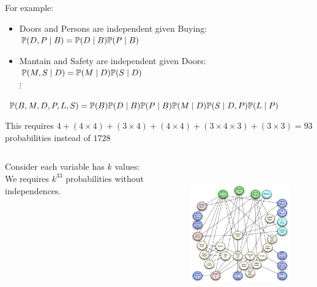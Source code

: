 \begin{frame}[fragile]
	For example:
	\begin{figure}
		\centering
		
	\end{figure}
	\begin{block}{}
		\begin{itemize}
			\item \alert{Doors} and \alert{Persons} are independent given \alert{Buying}: $\P( D , P \mid B ) = \P( D \mid B ) \P( P \mid B )$
			\item \alert{Mantain} and \alert{Safety} are independent given \alert{Doors}: $\P( M , S \mid D ) = \P( M \mid D ) \P( S \mid D )$
			\\$\vdots$
		\end{itemize}
	\end{block}
\end{frame}

\begin{frame}[fragile]
	\begin{figure}
		\centering
		
	\end{figure}
	\begin{block}{}
		$\P( B , M , D , P , L , S ) = \P( B ) \P( D \mid B ) \P( P \mid B ) \P( M \mid D ) \P( S \mid D , P ) \P( L \mid P )$
	\end{block}
	This requires $4 + (4 \times 4) + (3 \times 4) + (4 \times 4) + (3 \times 4 \times 3) + (3 \times 3) = 93$ probabilities instead of $1728$
\end{frame}
	
\begin{frame}[fragile]
	\begin{columns}
		\begin{column}{.3\linewidth}
			Consider each variable has $k$ values:\\
			We requires $k^{33}$ probabilities without independences.
		\end{column}
		\begin{column}{.6\linewidth}
			\begin{figure}
				\centering
				\includegraphics[height=17em]{images/complexbn}
			\end{figure}
		\end{column}
	\end{columns}
\end{frame}
